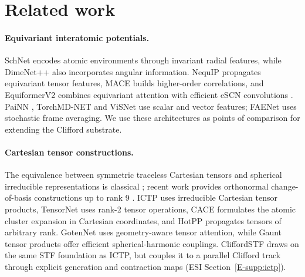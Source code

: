 \section{Related work}\label{sec:related}

\paragraph{Equivariant interatomic potentials.}
SchNet \cite{schutt2017schnet} encodes atomic environments through invariant radial features, while DimeNet++ \cite{gasteiger2020dimenetpp} also incorporates angular information. NequIP \cite{batzner2022nequip} propagates equivariant tensor features, MACE \cite{batatia2022mace} builds higher-order correlations, and EquiformerV2 \cite{liao2024equiformerv2} combines equivariant attention with efficient eSCN convolutions \cite{passaro2023escn}. PaiNN \cite{schutt2021painn}, TorchMD-NET \cite{tholke2022torchmdnet} and ViSNet \cite{wang2024visnet} use scalar and vector features; FAENet \cite{duval2023faenet} uses stochastic frame averaging. We use these architectures as points of comparison for extending the Clifford substrate.

\paragraph{Cartesian tensor constructions.}
The equivalence between symmetric traceless Cartesian tensors and spherical irreducible representations is classical \cite{stone2013theory}; recent work provides orthonormal change-of-basis constructions up to rank 9 \cite{shao2025orthonormal}. ICTP \cite{zaverkin2024ictp} uses irreducible Cartesian tensor products, TensorNet \cite{simeon2023tensornet} uses rank-2 tensor operations, CACE \cite{cheng2024cace} formulates the atomic cluster expansion in Cartesian coordinates, and HotPP \cite{wang2024n} propagates tensors of arbitrary rank. GotenNet \cite{aykent2025gotennet} uses geometry-aware tensor attention, while Gaunt tensor products \cite{luo2024gaunt} offer efficient spherical-harmonic couplings. CliffordSTF draws on the same STF foundation as ICTP, but couples it to a parallel Clifford track through explicit generation and contraction maps (ESI Section~\ref{E-supp:ictp}).


